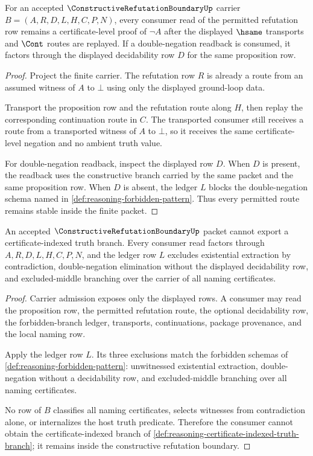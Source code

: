 \begin{theorem}
\label{thm:reasoning-contradiction-permitted-refutation-stability}
For an accepted $\ConstructiveRefutationBoundaryUp$ carrier $B=(A,R,D,L,H,C,P,N)$, every consumer read of the permitted refutation row remains a certificate-level proof of $\neg A$ after the displayed $\hsame$ transports and $\Cont$ routes are replayed. If a double-negation readback is consumed, it factors through the displayed decidability row $D$ for the same proposition row.
\end{theorem}
\begin{proof}
Project the finite carrier. The refutation row $R$ is already a route from an assumed witness of $A$ to $\bot$ using only the displayed ground-loop data.

Transport the proposition row and the refutation route along $H$, then replay the corresponding continuation route in $C$. The transported consumer still receives a route from a transported witness of $A$ to $\bot$, so it receives the same certificate-level negation and no ambient truth value.

For double-negation readback, inspect the displayed row $D$. When $D$ is present, the readback uses the constructive branch carried by the same packet and the same proposition row. When $D$ is absent, the ledger $L$ blocks the double-negation schema named in \autoref{def:reasoning-forbidden-pattern}. Thus every permitted route remains stable inside the finite packet.
\end{proof}

\begin{theorem}
\label{thm:reasoning-contradiction-forbidden-branch-nonexport}
An accepted $\ConstructiveRefutationBoundaryUp$ packet cannot export a certificate-indexed truth branch. Every consumer read factors through $A,R,D,L,H,C,P,N$, and the ledger row $L$ excludes existential extraction by contradiction, double-negation elimination without the displayed decidability row, and excluded-middle branching over the carrier of all naming certificates.
\end{theorem}
\begin{proof}
Carrier admission exposes only the displayed rows. A consumer may read the proposition row, the permitted refutation route, the optional decidability row, the forbidden-branch ledger, transports, continuations, package provenance, and the local naming row.

Apply the ledger row $L$. Its three exclusions match the forbidden schemas of \autoref{def:reasoning-forbidden-pattern}: unwitnessed existential extraction, double-negation without a decidability row, and excluded-middle branching over all naming certificates.

No row of $B$ classifies all naming certificates, selects witnesses from contradiction alone, or internalizes the host truth predicate. Therefore the consumer cannot obtain the certificate-indexed branch of \autoref{def:reasoning-certificate-indexed-truth-branch}; it remains inside the constructive refutation boundary.
\end{proof}

